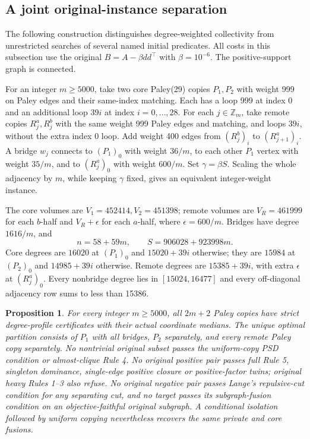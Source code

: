 \documentclass[sigconf,anonymous,review]{acmart}
\newtheorem{proposition}{Proposition}
\newcommand{\1}{\mathbf{1}}
\begin{document}
\subsection{A joint original-instance separation}\label{app:guarded}
The following construction distinguishes degree-weighted collectivity from
unrestricted searches of several named initial predicates. All costs in this
subsection use the original $B=A-\beta dd^\top$ with $\beta=10^{-6}$.
The positive-support graph is connected.

For an integer $m\ge5000$, take two core Paley(29) copies $P_1,P_2$ with
weight 999 on Paley edges and their same-index matching. Each has a loop 999
at index 0 and an additional loop $39i$ at index $i=0,\ldots,28$.
For each $j\in\mathbb Z_m$, take remote copies $R_j^a,R_j^b$ with the same
weight 999 Paley edges and matching, and loops $39i$, without the extra
index 0 loop. Add weight 400 edges from $(R_j^b)_i$ to $(R_{j+1}^a)_i$.
A bridge $w_j$ connects to $(P_1)_0$ with weight $36/m$, to each other
$P_1$ vertex with weight $35/m$, and to $(R_j^a)_0$ with weight $600/m$.
Set $\gamma=\beta S$. Scaling the whole adjacency by $m$, while keeping
$\gamma$ fixed, gives an equivalent integer-weight instance.

The core volumes are $V_1=452414,V_2=451398$; remote volumes are
$V_R=461999$ for each $b$-half and $V_R+\epsilon$ for each $a$-half,
where $\epsilon=600/m$. Bridges have degree $1616/m$, and
\[
 n=58+59m,\qquad S=906028+923998m.
\]
Core degrees are $16020$ at $(P_1)_0$ and $15020+39i$ otherwise;
they are $15984$ at $(P_2)_0$ and $14985+39i$ otherwise.
Remote degrees are $15385+39i$, with extra $\epsilon$ at $(R_j^a)_0$.
Every nonbridge degree lies in $[15024,16477]$ and every off-diagonal
adjacency row sums to less than 15386.

\begin{proposition}\label{prop:guarded}
For every integer $m\ge5000$, all $2m+2$ Paley copies have strict
degree-profile certificates with their actual coordinate medians.
The unique optimal partition consists of $P_1$ with all bridges,
$P_2$ separately, and every remote Paley copy separately.
No nontrivial original subset passes the uniform-copy PSD condition or
almost-clique Rule 4. No original positive pair passes full Rule 5,
singleton dominance, single-edge positive closure or positive-factor twins;
original heavy Rules 1--3 also refuse. No original negative pair passes
Lange's repulsive-cut condition for any separating cut, and no target
passes its subgraph-fusion condition on an objective-faithful original
subgraph. A conditional isolation followed by uniform copying nevertheless
recovers the same private and core fusions.
\end{proposition}
\end{document}
